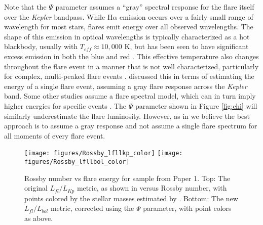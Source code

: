\documentclass[preprint2]{aastex62}
\newcommand{\Kepler}{\textsl{Kepler}\xspace}
\begin{document}
Note that the $\Psi$ parameter assumes a ``gray'' spectral response for the flare itself over the \Kepler bandpass. While H$\alpha$ emission occurs over a fairly small range of wavelength for most stars, flares emit energy over all observed wavelengths. The shape of this emission in optical wavelengths is typically characterized as a hot blackbody, usually with $T_{eff}\approx10,000$ K, but has been seen to have significant excess emission in both the blue and red \citep[e.g. see][]{kowalski2013}. This effective temperature also changes throughout the flare event in a manner that is not well characterized, particularly for complex, multi-peaked flare events \citep[e.g.][]{slhadleo,kowalski2012}. \citet{davenport2016} discussed this in terms of estimating the energy of a single flare event, assuming a gray flare response across the \Kepler band. Some other studies assume a flare spectral model, which can in turn imply higher energies for specific events \citep[e.g.][]{gizis2013,maehara2015}. The $\Psi$ parameter shown in Figure \ref{fig:chi} will similarly underestimate the flare luminosity. However, as in \citet{davenport2016} we believe the best approach is to assume a gray response and not assume a single flare spectrum for all moments of every flare event.


\begin{figure}[!t]
\centering
\texttt{[image: figures/Rossby\_lfllkp\_color]}
\texttt{[image: figures/Rossby\_lfllbol\_color]}
\caption{
Rossby number vs flare energy for sample from Paper 1.
Top: The original $L_{fl}/L_{Kp}$ metric, as shown in \citet{davenport2016} versus Rossby number, with points colored by the stellar masses estimated by \citet{davenport2016} .
Bottom: The new $L_{fl}/L_{bol}$ metric, corrected using the $\Psi$ parameter, with point colors as above.
}
\label{fig:rossby1}
\end{figure}
  
\end{document}
